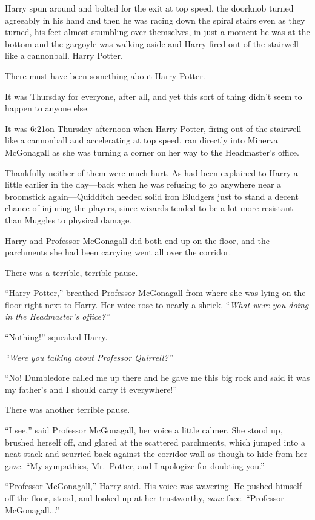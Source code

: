 Harry spun around and bolted for the exit at top speed, the doorknob turned agreeably in his hand and then he was racing down the spiral stairs even as they turned, his feet almost stumbling over themselves, in just a moment he was at the bottom and the gargoyle was walking aside and Harry fired out of the stairwell like a cannonball.
\sbreak
Harry Potter.

There must have been something about Harry Potter.

It was Thursday for everyone, after all, and yet this sort of thing didn’t seem to happen to anyone else.

It was 6:21\PM on Thursday afternoon when Harry Potter, firing out of the stairwell like a cannonball and accelerating at top speed, ran directly into Minerva McGonagall as she was turning a corner on her way to the Headmaster’s office.

Thankfully neither of them were much hurt. As had been explained to Harry a little earlier in the day—back when he was refusing to go anywhere near a broomstick again—Quidditch needed solid iron Bludgers just to stand a decent chance of injuring the players, since wizards tended to be a lot more resistant than Muggles to physical damage.

Harry and Professor McGonagall did both end up on the floor, and the parchments she had been carrying went all over the corridor.

There was a terrible, terrible pause.

“Harry Potter,” breathed Professor McGonagall from where she was lying on the floor right next to Harry. Her voice rose to nearly a shriek. “\emph{What were you doing in the Headmaster’s office?”}

“Nothing!” squeaked Harry.

\emph{“Were you talking about Professor Quirrell?”}

“No! Dumbledore called me up there and he gave me this big rock and said it was my father’s and I should carry it everywhere!”

There was another terrible pause.

“I see,” said Professor McGonagall, her voice a little calmer. She stood up, brushed herself off, and glared at the scattered parchments, which jumped into a neat stack and scurried back against the corridor wall as though to hide from her gaze. “My sympathies, Mr.~Potter, and I apologize for doubting you.”

“Professor McGonagall,” Harry said. His voice was wavering. He pushed himself off the floor, stood, and looked up at her trustworthy, \emph{sane} face. “Professor McGonagall...”


